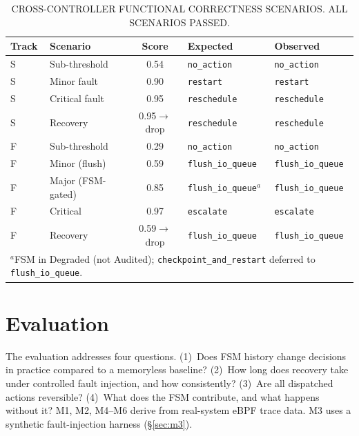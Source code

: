 \documentclass[conference]{IEEEtran}
\begin{document}
\begin{table}[!t]
\caption{CROSS-CONTROLLER FUNCTIONAL CORRECTNESS SCENARIOS. ALL SCENARIOS PASSED.}
\label{tab:scenarios}
\centering
\renewcommand{\arraystretch}{1.15}
\begin{tabular}{llcll}
\hline
\textbf{Track} & \textbf{Scenario} & \textbf{Score} & \textbf{Expected} & \textbf{Observed} \\
\hline
S & Sub-threshold     & 0.54                  & \texttt{no\_action}           & \texttt{no\_action} \\
S & Minor fault       & 0.90                  & \texttt{restart}              & \texttt{restart} \\
S & Critical fault    & 0.95                  & \texttt{reschedule}           & \texttt{reschedule} \\
S & Recovery          & 0.95$\rightarrow$drop & \texttt{reschedule}           & \texttt{reschedule} \\
F & Sub-threshold     & 0.29                  & \texttt{no\_action}           & \texttt{no\_action} \\
F & Minor (flush)     & 0.59                  & \texttt{flush\_io\_queue}     & \texttt{flush\_io\_queue} \\
F & Major (FSM-gated) & 0.85                  & \texttt{flush\_io\_queue}$^{a}$ & \texttt{flush\_io\_queue} \\
F & Critical          & 0.97                  & \texttt{escalate}             & \texttt{escalate} \\
F & Recovery          & 0.59$\rightarrow$drop & \texttt{flush\_io\_queue}     & \texttt{flush\_io\_queue} \\
\hline
\multicolumn{5}{l}{\footnotesize $^{a}$FSM in Degraded (not Audited); \texttt{checkpoint\_and\_restart} deferred to \texttt{flush\_io\_queue}.}
\end{tabular}
\end{table}

\section{Evaluation}
\label{sec:eval}

The evaluation addresses four questions. (1)~Does FSM history change decisions in practice compared to a memoryless baseline? (2)~How long does recovery take under controlled fault injection, and how consistently? (3)~Are all dispatched actions reversible? (4)~What does the FSM contribute, and what happens without it? M1, M2, M4--M6 derive from real-system eBPF trace data. M3 uses a synthetic fault-injection harness (§\ref{sec:m3}).
\end{document}
